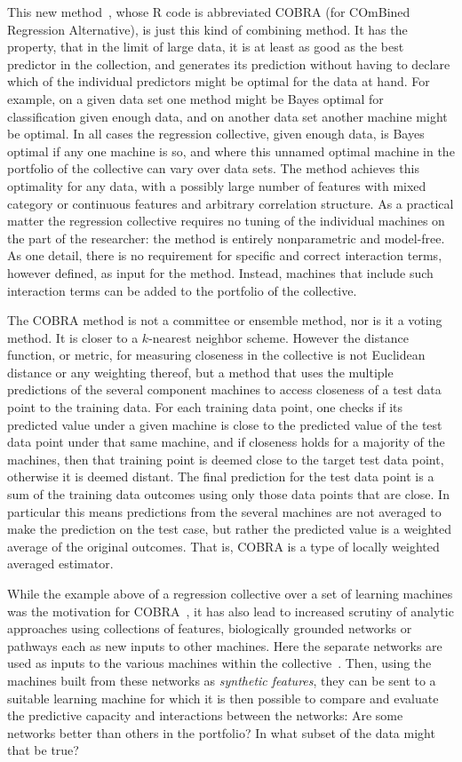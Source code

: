 \documentclass{bmcart}
\begin{document}
This new method~\cite{biau:2013}, whose R code is abbreviated COBRA
(for COmBined Regression Alternative), is just this kind of combining
method.  It has the property, that in the limit of large data, it is
at least as good as the best predictor in the collection, and
generates its prediction without having to declare which of the
individual predictors might be optimal for the data at hand. For
example, on a given data set one method might be Bayes optimal for
classification given enough data, and on another data set another
machine might be optimal. In all cases the regression collective,
given enough data, is Bayes optimal if any one machine is so, and
where this unnamed optimal machine in the portfolio of the collective
can vary over data sets.  The method achieves this optimality for any
data, with a possibly large number of features with mixed category or
continuous features and arbitrary correlation structure. As a
practical matter the regression collective requires no tuning of the
individual machines on the part of the researcher: the method is
entirely nonparametric and model-free. As one detail, there is no
requirement for specific and correct interaction terms, however
defined, as input for the method. Instead, machines that include such
interaction terms can be added to the portfolio of the collective.


The COBRA method is not a committee or ensemble method, nor is it a
voting method.  It is closer to a $k$-nearest neighbor scheme. However
the distance function, or metric, for measuring closeness in the
collective is not Euclidean distance or any weighting thereof, but a
method that uses the multiple predictions of the several component
machines to access closeness of a test data point to the training
data.  For each training data point, one checks if its predicted value
under a given machine is close to the predicted value of the test data
point under that same machine, and if closeness holds for a majority
of the machines, then that training point is deemed close to the
target test data point, otherwise it is deemed distant.  The final
prediction for the test data point is a sum of the training data
outcomes using only those data points that are close.  In particular
this means predictions from the several machines are not averaged to
make the prediction on the test case, but rather the predicted value
is a weighted average of the original outcomes.  That is, COBRA is a
type of locally weighted averaged estimator.

While the example above of a regression collective over a set of
learning machines was the motivation for COBRA~\cite{biau:2013}, it
has also lead to increased scrutiny of analytic approaches using
collections of features, biologically grounded networks or pathways
each as new inputs to other machines. Here the separate networks are
used as inputs to the various machines within the
collective~\cite{pan:2014}. Then, using the machines built from these
networks as {\it synthetic features}, they can be sent to a suitable
learning machine for which it is then possible to compare and evaluate
the predictive capacity and interactions between the networks: Are
some networks better than others in the portfolio? In what subset of
the data might that be true?
\end{document}
